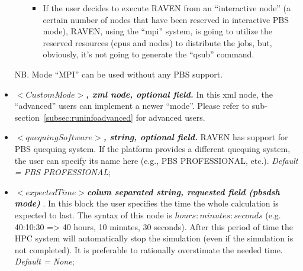 \begin{itemize}
\begin{itemize}
\begin{itemize}
           \item If the user decides to execute RAVEN from an ``interactive node'' (a certain number of nodes that have been reserved in interactive PBS mode), RAVEN, using the ``mpi'' system, is going to utilize the reserved resources (cpus and nodes) to distribute the jobs, but, obviously, it's not going to generate the ``qsub'' command. 
         \end{itemize}
     \end{itemize}
     NB. Mode ``MPI'' can be used without any PBS support.

\item $<CustomMode>$\textbf{\textit{, xml node, optional field.}} In this xml node, the ``advanced'' users can implement a newer ``mode''. Please refer to sub-section~\ref{subsec:runinfoadvanced} for advanced users.

\item $<quequingSoftware>$\textbf{\textit{, string, optional field.}} RAVEN has support for PBS quequing system. If the platform provides a different quequing system, the user can specify its name here (e.g., PBS PROFESSIONAL, etc.). \textit{Default = PBS PROFESSIONAL};

\item $<expectedTime>$\textbf{\textit{colum separated string, requested field (pbsdsh mode) }}. In this block the user specifies the time the whole calculation is expected to last. The syntax of this node is $hours:minutes:seconds$ (e.g. 40:10:30 => 40 hours, 10 minutes, 30 seconds). After this period of time the HPC system will automatically stop the simulation (even if the simulation is not completed). It is preferable to rationally overstimate the needed time. \textit{Default = None};
\end{itemize}


